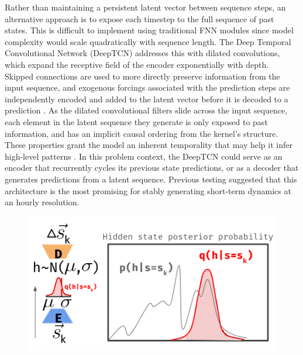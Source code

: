 \documentclass[11pt]{article}
\begin{document}
\begin{multicols}{2}
    Rather than maintaining a persistent latent vector between sequence steps, an alternative approach is to expose each timestep to the full sequence of past states. This is difficult to implement using traditional FNN modules since model complexity would scale quadratically with sequence length. The Deep Temporal Convolutional Network (DeepTCN) addresses this with dilated convolutions, which expand the receptive field of the encoder exponentially with depth. Skipped connections are used to more directly preserve information from the input sequence, and exogenous forcings associated with the prediction steps are independently encoded and added to the latent vector before it is decoded to a prediction \cite{chen_probabilistic_2020}. As the dilated convolutional filters slide across the input sequence, each element in the latent sequence they generate is only exposed to past information, and has an implicit causal ordering from the kernel's structure. These properties grant the model an inherent temporality that may help it infer high-level patterns \cite{oord_wavenet_2016}. In this problem context, the DeepTCN could serve as an encoder that recurrently cycles its previous state predictions, or as a decoder that generates predictions from a latent sequence. Previous testing suggested that this architecture is the most promising for stably generating short-term dynamics at an hourly resolution.

    \begin{figure}[H]
        \centering

        \includegraphics[width=.95\linewidth]{figs/ved.png}


\end{figure}
\end{multicols}
\end{document}
